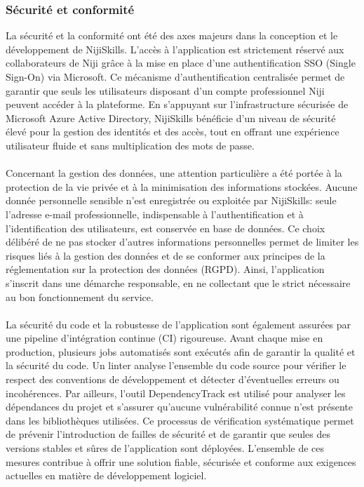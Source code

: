\documentclass[12pt]{article}
\begin{document}
\subsubsection{Sécurité et conformité}
La sécurité et la conformité ont été des axes majeurs dans la conception et le développement de NijiSkills. L’accès à l’application est strictement réservé aux collaborateurs de Niji grâce à la mise en place d’une authentification SSO (Single Sign-On) via Microsoft. Ce mécanisme d’authentification centralisée permet de garantir que seuls les utilisateurs disposant d’un compte professionnel Niji peuvent accéder à la plateforme. En s’appuyant sur l’infrastructure sécurisée de Microsoft Azure Active Directory, NijiSkills bénéficie d’un niveau de sécurité élevé pour la gestion des identités et des accès, tout en offrant une expérience utilisateur fluide et sans multiplication des mots de passe.
\\\\
Concernant la gestion des données, une attention particulière a été portée à la protection de la vie privée et à la minimisation des informations stockées. Aucune donnée personnelle sensible n’est enregistrée ou exploitée par NijiSkills: seule l’adresse e-mail professionnelle, indispensable à l’authentification et à l’identification des utilisateurs, est conservée en base de données. Ce choix délibéré de ne pas stocker d’autres informations personnelles permet de limiter les risques liés à la gestion des données et de se conformer aux principes de la réglementation sur la protection des données (RGPD). Ainsi, l’application s’inscrit dans une démarche responsable, en ne collectant que le strict nécessaire au bon fonctionnement du service.
\\\\
La sécurité du code et la robustesse de l’application sont également assurées par une pipeline d’intégration continue (CI) rigoureuse. Avant chaque mise en production, plusieurs jobs automatisés sont exécutés afin de garantir la qualité et la sécurité du code. Un linter analyse l’ensemble du code source pour vérifier le respect des conventions de développement et détecter d’éventuelles erreurs ou incohérences. Par ailleurs, l’outil DependencyTrack est utilisé pour analyser les dépendances du projet et s’assurer qu’aucune vulnérabilité connue n’est présente dans les bibliothèques utilisées. Ce processus de vérification systématique permet de prévenir l’introduction de failles de sécurité et de garantir que seules des versions stables et sûres de l’application sont déployées. L’ensemble de ces mesures contribue à offrir une solution fiable, sécurisée et conforme aux exigences actuelles en matière de développement logiciel.
\end{document}
